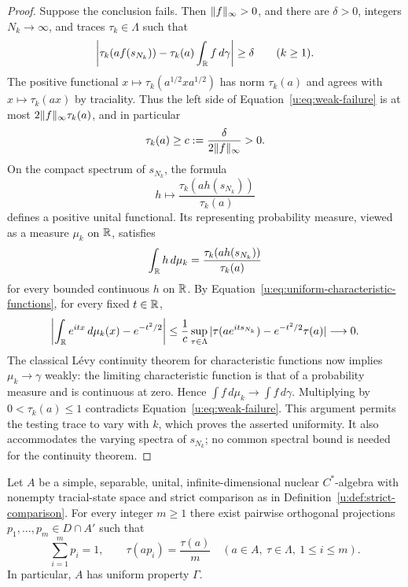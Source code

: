 \begin{proof}
Suppose the conclusion fails.  Then $\lVert f\rVert_\infty>0$, and there
are $\delta>0$, integers $N_k\to\infty$, and traces
$\tau_k\in\Lambda$ such that
\begin{equation}
\label{u:eq:weak-failure}
  \left|\tau_k(af(s_{N_k}))
       -\tau_k(a)\int_{\mathbb R}f\,d\gamma\right|\geq\delta
  \qquad(k\geq1).
\end{equation}
The positive functional $x\mapsto\tau_k(a^{1/2}xa^{1/2})$ has norm
$\tau_k(a)$ and agrees with $x\mapsto\tau_k(ax)$ by traciality.
Thus the left side of Equation~\eqref{u:eq:weak-failure} is at most
$2\lVert f\rVert_\infty\tau_k(a)$, and in particular
\[
  \tau_k(a)\geq c:=\frac{\delta}{2\lVert f\rVert_\infty}>0.
\]
On the compact spectrum of $s_{N_k}$, the formula
\[
  h\longmapsto
  \frac{\tau_k(ah(s_{N_k}))}{\tau_k(a)}
\]
defines a positive unital functional.  Its representing probability
measure, viewed as a measure $\mu_k$ on $\mathbb R$, satisfies
\[
  \int_{\mathbb R}h\,d\mu_k
     =\frac{\tau_k(ah(s_{N_k}))}{\tau_k(a)}
\]
for every bounded continuous $h$ on $\mathbb R$.  By
Equation~\eqref{u:eq:uniform-characteristic-functions}, for every fixed
$t\in\mathbb R$,
\[
  \left|\int_{\mathbb R}e^{itx}\,d\mu_k(x)-e^{-t^2/2}\right|
  \leq\frac{1}{c}
  \sup_{\tau\in\Lambda}
  |\tau(ae^{its_{N_k}})-e^{-t^2/2}\tau(a)|
  \longrightarrow0.
\]
The classical L\'evy continuity theorem for characteristic functions
\cite[Theorem~1.1]{Dobler} now implies $\mu_k\to\gamma$ weakly:
the limiting characteristic
function is that of a probability measure and is continuous at zero.
Hence $\int f\,d\mu_k\to\int f\,d\gamma$.  Multiplying by
$0<\tau_k(a)\leq1$ contradicts Equation~\eqref{u:eq:weak-failure}.
This argument permits the testing trace to vary with $k$, which proves
the asserted uniformity.  It also accommodates the varying spectra of
$s_{N_k}$; no common spectral bound is needed for the continuity
theorem.
\end{proof}

\begin{theorem}
\label{u:thm:uniform-gamma}
Let $A$ be a simple, separable, unital, infinite-dimensional nuclear
$C^*$-algebra with nonempty tracial-state space and strict comparison
as in Definition~\ref{u:def:strict-comparison}.  For every integer
$m\geq1$ there exist pairwise orthogonal projections
$p_1,\ldots,p_m\in D\cap A'$ such that
\begin{equation}
\label{u:eq:gamma-projections}
  \sum_{i=1}^m p_i=1,
  \qquad
  \tau(ap_i)=\frac{\tau(a)}{m}
  \quad(a\in A,\ \tau\in\Lambda,\ 1\leq i\leq m).
\end{equation}
In particular, $A$ has uniform property $\Gamma$.
\end{theorem}

